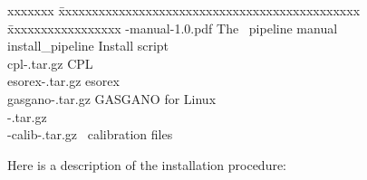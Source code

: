 \begin{tabbing}
xxxxxxx \=  xxxxxxxxxxxxxxxxxxxxxxxxxxxxxxxxxxxxxxxxxxxxx \= xxxxxxxxxxxxxxxxx \kill
\> \pipename-manual-1.0.pdf     \> The \instname\, pipeline manual      \\
\> install\_pipeline          \> Install script                 \\
\> cpl-\cplvers.tar.gz           \> CPL \cplvers                      \\
\> esorex-\esorexvers.tar.gz        \> esorex \esorexvers                   \\
\> gasgano-\gasganovers.tar.gz \> GASGANO \gasganovers for Linux        \\
\> \pipename-\pipelinevers.tar.gz         \> \instname\, \pipelinevers                    \\
\> \pipename-calib-\pipelinevers.tar.gz   \> \instname\, calibration files \pipelinevers  \\
\end{tabbing}

Here is a description of the installation procedure:

